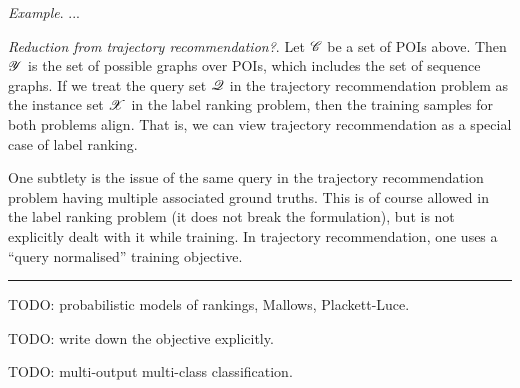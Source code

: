 \emph{Example}.
...

\emph{Reduction from trajectory recommendation?}.
Let $\mathscr{C}$ be a set of POIs above.
Then $\mathscr{Y}$ is the set of possible graphs over POIs,
which includes the set of sequence graphs.
If we treat the query set $\mathscr{Q}$ in the trajectory recommendation problem as the instance set $\mathscr{X}$ in the label ranking problem,
then the training samples for both problems align.
That is, we can view trajectory recommendation as a special case of label ranking.

One subtlety is the issue of the same query in the trajectory recommendation problem having multiple associated ground truths. 
This is of course allowed in the label ranking problem (\ie it does not break the formulation),
but is not explicitly dealt with it while training.
In trajectory recommendation, one uses a ``query normalised'' training objective.

\vspace{12pt}
\hrule
\vspace{12pt}

{\color{red} TODO: probabilistic models of rankings, \eg Mallows, Plackett-Luce.}

{\color{red} TODO: write down the objective explicitly.}

{\color{red} TODO: multi-output multi-class classification.}
